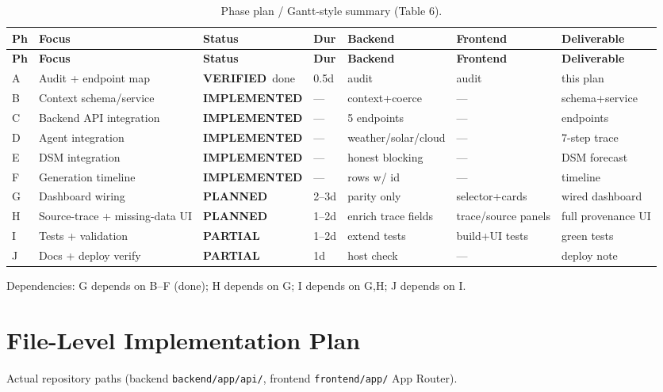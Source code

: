\documentclass[11pt,a4paper]{article}
\newcommand{\stImpl}{\textcolor{cok}{\textbf{IMPLEMENTED}}}
\newcommand{\stV}{\textcolor{cok}{\textbf{VERIFIED}}}
\newcommand{\stP}{\textcolor{cpart}{\textbf{PARTIAL}}}
\newcommand{\stPlan}{\textcolor{cplan}{\textbf{PLANNED}}}
\newcommand{\code}[1]{\texttt{\small #1}}
\begin{document}
\begin{footnotesize}
\begin{longtable}{@{}p{0.5cm}p{2.5cm}p{1.6cm}p{1.4cm}p{2.6cm}p{2.6cm}p{2.0cm}@{}}
\caption{Phase plan / Gantt-style summary (Table 6).}\label{tab:gantt}\\
\toprule
\textbf{Ph} & \textbf{Focus} & \textbf{Status} & \textbf{Dur} & \textbf{Backend} & \textbf{Frontend} & \textbf{Deliverable}\\
\midrule
\endfirsthead
\toprule
\textbf{Ph} & \textbf{Focus} & \textbf{Status} & \textbf{Dur} & \textbf{Backend} & \textbf{Frontend} & \textbf{Deliverable}\\
\midrule
\endhead
\bottomrule
\endfoot
A & Audit + endpoint map & \stV\ done & 0.5d & audit & audit & this plan\\
B & Context schema/service & \stImpl & --- & context+coerce & --- & schema+service\\
C & Backend API integration & \stImpl & --- & 5 endpoints & --- & endpoints\\
D & Agent integration & \stImpl & --- & weather/solar/cloud & --- & 7-step trace\\
E & DSM integration & \stImpl & --- & honest blocking & --- & DSM forecast\\
F & Generation timeline & \stImpl & --- & rows w/ id & --- & timeline\\
G & Dashboard wiring & \stPlan & 2--3d & parity only & selector+cards & wired dashboard\\
H & Source-trace + missing-data UI & \stPlan & 1--2d & enrich trace fields & trace/source panels & full provenance UI\\
I & Tests + validation & \stP & 1--2d & extend tests & build+UI tests & green tests\\
J & Docs + deploy verify & \stP & 1d & host check & --- & deploy note\\
\end{longtable}
\end{footnotesize}

\noindent Dependencies: G depends on B--F (done); H depends on G; I depends on G,H; J depends on I.

\section{File-Level Implementation Plan}
Actual repository paths (backend \code{backend/app/api/}, frontend \code{frontend/app/} App Router).
\end{document}
